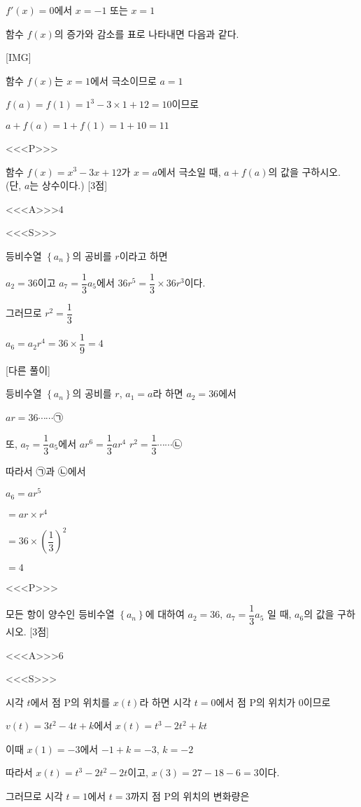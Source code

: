 \documentclass{oblivoir}
\begin{document}
$f'(x)=0$에서 $x=-1$ 또는 $x=1$

함수 $f(x)$의 증가와 감소를 표로 나타내면 다음과 같다.

[IMG]

함수 $f(x)$는 $x=1$에서 극소이므로 $a=1$

$f(a)=f(1)=1^{3}-3\times 1+12=10$이므로

$a+f(a)=1+f(1)=1+10=11$

<<<P>>>

함수 $f(x)=x^{3}-3x+12$가 $x=a$에서 극소일 때, $a+f(a)$의 값을 구하시오. (단, $a$는 상수이다.) [3점]

<<<A>>>$4$

<<<S>>>

등비수열 $\left\{a_{n}\right\}$의 공비를 $r$이라고 하면 

$a_{2}=36$이고 $a_{7}=\dfrac{1}{3}a_{5}$에서 $36r^{5}=\dfrac{1}{3}\times 36r^{3}$이다. 

그러므로 $r^{2}=\dfrac{1}{3}$

$a_{6}=a_{2}r^{4}=36\times\dfrac{1}{9}=4$

[다른 풀이]

등비수열 $\left\{a_{n}\right\}$의 공비를 $r$, $a_{1}=a$라 하면 $a_{2}=36$에서

$ar=36\cdots\cdots$㉠

또, $a_{7}=\dfrac{1}{3}a_{5}$에서 $ar^{6}=\dfrac{1}{3}ar^{4}$   $r^{2}=\dfrac{1}{3}\cdots\cdots$㉡

따라서 ㉠과 ㉡에서

$a_{6}$$=ar^{5}$

$=ar\times r^{4}$

$=36\times\left(\dfrac{1}{3}\right)^{2}$

$=4$

<<<P>>>

모든 항이 양수인 등비수열 $\left\{a_{n}\right\}$에 대하여
$a_{2}= 36 ,\: a_{7}=\dfrac{1}{3}a_{5}$
일 때, $a_{6}$의 값을 구하시오. [3점]

<<<A>>>$6$

<<<S>>>

시각 $t$에서 점 $\mathrm{P}$의 위치를 $x(t)$라 하면 시각 $t=0$에서 점 $\mathrm{P}$의 위치가 $0$이므로

$v(t)=3t^{2}-4t+k$에서 $x(t)=t^{3}-2t^{2}+kt$

이때 $x(1)= -3$에서 $-1+k = -3$, $k= -2$

따라서 $x(t)=t^{3}-2t^{2}-2t$이고, $x(3)=27-18-6=3$이다.

그러므로 시각 $t=1$에서 $t=3$까지 점 $\mathrm{P}$의 위치의 변화량은
\end{document}
